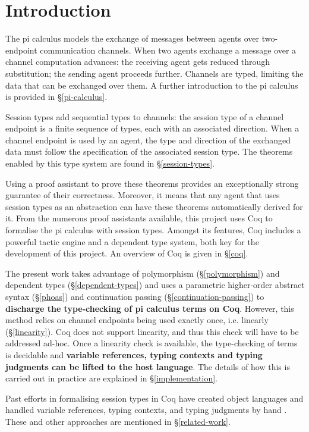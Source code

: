\documentclass{mproj}
\begin{document}
\chapter{Introduction}\label{intro}

The pi calculus models the exchange of messages between agents over two-endpoint communication channels. When two agents exchange a message over a channel computation advances: the receiving agent gets reduced through substitution; the sending agent proceeds further. Channels are typed, limiting the data that can be exchanged over them. A further introduction to the pi calculus is provided in \S \ref{pi-calculus}.

Session types add sequential types to channels: the session type of a channel endpoint is a finite sequence of types, each with an associated direction.  When a channel endpoint is used by an agent, the type and direction of the exchanged data must follow the specification of the associated session type. The theorems enabled by this type system are found in \S \ref{session-types}.

Using a proof assistant to prove these theorems provides an exceptionally strong guarantee of their correctness. Moreover, it means that any agent that uses session types as an abstraction can have these theorems automatically derived for it. From the numerous proof assistants available, this project uses Coq to formalise the pi calculus with session types. Amongst its features, Coq includes a powerful tactic engine and a dependent type system, both key for the development of this project. An overview of Coq is given in \S \ref{coq}.

The present work takes advantage of polymorphism (\S \ref{polymorphism}) and dependent types (\S \ref{dependent-types}) and uses a parametric higher-order abstract syntax (\S \ref{phoas}) and continuation passing (\S \ref{continuation-passing}) to \textbf{discharge the type-checking of pi calculus terms on Coq}. However, this method relies on channel endpoints being used exactly once, i.e. linearly (\S \ref{linearity}). Coq does not support linearity, and thus this check will have to be addressed ad-hoc. Once a linearity check is available, the type-checking of terms is decidable and \textbf{variable references, typing contexts and typing judgments can be lifted to the host language}. The details of how this is carried out in practice are explained in \S \ref{implementation}.

Past efforts in formalising session types in Coq have created object languages and handled variable references, typing contexts, and typing judgments by hand \cite{Dilmore2019}. These and other approaches are mentioned in \S \ref{related-work}.
\end{document}
